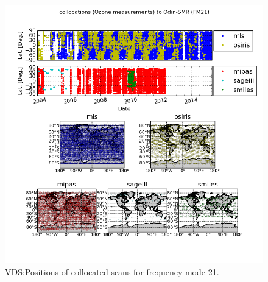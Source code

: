 \begin{figure}[t]
\centering
\includegraphics[width=17cm]{test_collocation_fm21.png}
\caption{VDS:Positions of collocated scans for frequency mode 21.}
\label{fig:vdsfm21}
\end{figure}






